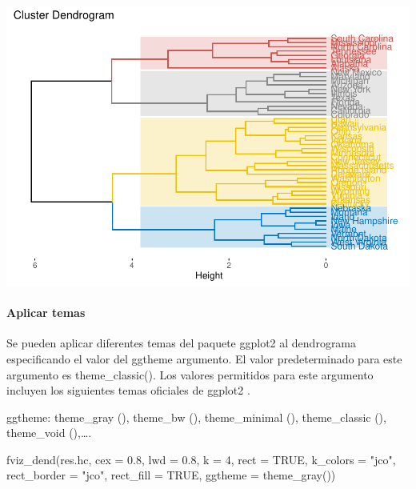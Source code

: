 \documentclass[
]{article}
\newenvironment{Shaded}{\begin{snugshade}}{\end{snugshade}}
\newcommand{\AttributeTok}[1]{\textcolor[rgb]{0.77,0.63,0.00}{#1}}
\newcommand{\ConstantTok}[1]{\textcolor[rgb]{0.00,0.00,0.00}{#1}}
\newcommand{\DecValTok}[1]{\textcolor[rgb]{0.00,0.00,0.81}{#1}}
\newcommand{\FloatTok}[1]{\textcolor[rgb]{0.00,0.00,0.81}{#1}}
\newcommand{\FunctionTok}[1]{\textcolor[rgb]{0.00,0.00,0.00}{#1}}
\newcommand{\NormalTok}[1]{#1}
\newcommand{\StringTok}[1]{\textcolor[rgb]{0.31,0.60,0.02}{#1}}
\begin{document}
\includegraphics{clusterjerarquico1_files/figure-latex/unnamed-chunk-12-1.pdf}

\hypertarget{aplicar-temas}{%
\paragraph{Aplicar temas}\label{aplicar-temas}}

Se pueden aplicar diferentes temas del paquete ggplot2 al dendrograma
especificando el valor del ggtheme argumento. El valor predeterminado
para este argumento es theme\_classic(). Los valores permitidos para
este argumento incluyen los siguientes temas oficiales de ggplot2 .

ggtheme: theme\_gray (), theme\_bw (), theme\_minimal (), theme\_classic
(), theme\_void (),\ldots.

\begin{Shaded}
\begin{Highlighting}[]
\FunctionTok{fviz\_dend}\NormalTok{(res.hc, }\AttributeTok{cex =} \FloatTok{0.8}\NormalTok{, }\AttributeTok{lwd =} \FloatTok{0.8}\NormalTok{, }\AttributeTok{k =} \DecValTok{4}\NormalTok{, }
          \AttributeTok{rect =} \ConstantTok{TRUE}\NormalTok{, }
          \AttributeTok{k\_colors =} \StringTok{"jco"}\NormalTok{, }
          \AttributeTok{rect\_border =} \StringTok{"jco"}\NormalTok{, }
          \AttributeTok{rect\_fill =} \ConstantTok{TRUE}\NormalTok{,}
          \AttributeTok{ggtheme =} \FunctionTok{theme\_gray}\NormalTok{())}
\end{Highlighting}
\end{Shaded}
\end{document}
